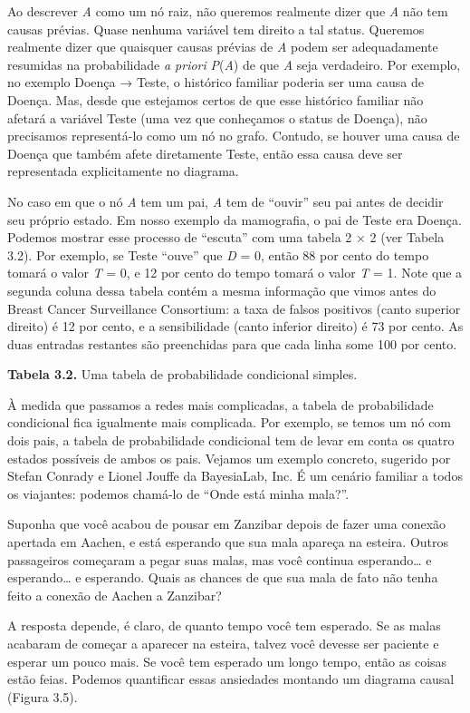 \documentclass[11pt,a5paper,twoside]{book}
\begin{document}
Ao descrever \textit{A} como um nó raiz, não queremos realmente dizer que \textit{A} não tem causas prévias. Quase nenhuma variável tem direito a tal status. Queremos realmente dizer que quaisquer causas prévias de \textit{A} podem ser adequadamente resumidas na probabilidade \textit{a priori} \textit{P}(\textit{A}) de que \textit{A} seja verdadeiro. Por exemplo, no exemplo Doença → Teste, o histórico familiar poderia ser uma causa de Doença. Mas, desde que estejamos certos de que esse histórico familiar não afetará a variável Teste (uma vez que conheçamos o status de Doença), não precisamos representá-lo como um nó no grafo. Contudo, se houver uma causa de Doença que também afete diretamente Teste, então essa causa deve ser representada explicitamente no diagrama.

No caso em que o nó \textit{A} tem um pai, \textit{A} tem de “ouvir” seu pai antes de decidir seu próprio estado. Em nosso exemplo da mamografia, o pai de Teste era Doença. Podemos mostrar esse processo de “escuta” com uma tabela 2 × 2 (ver Tabela 3.2). Por exemplo, se Teste “ouve” que \textit{D} = 0, então 88 por cento do tempo tomará o valor \textit{T} = 0, e 12 por cento do tempo tomará o valor \textit{T} = 1. Note que a segunda coluna dessa tabela contém a mesma informação que vimos antes do Breast Cancer Surveillance Consortium: a taxa de falsos positivos (canto superior direito) é 12 por cento, e a sensibilidade (canto inferior direito) é 73 por cento. As duas entradas restantes são preenchidas para que cada linha some 100 por cento.

\textbf{Tabela 3.2.} Uma tabela de probabilidade condicional simples.

À medida que passamos a redes mais complicadas, a tabela de probabilidade condicional fica igualmente mais complicada. Por exemplo, se temos um nó com dois pais, a tabela de probabilidade condicional tem de levar em conta os quatro estados possíveis de ambos os pais. Vejamos um exemplo concreto, sugerido por Stefan Conrady e Lionel Jouffe da BayesiaLab, Inc. É um cenário familiar a todos os viajantes: podemos chamá-lo de “Onde está minha mala?”.

Suponha que você acabou de pousar em Zanzibar depois de fazer uma conexão apertada em Aachen, e está esperando que sua mala apareça na esteira. Outros passageiros começaram a pegar suas malas, mas você continua esperando… e esperando… e esperando. Quais as chances de que sua mala de fato não tenha feito a conexão de Aachen a Zanzibar?

A resposta depende, é claro, de quanto tempo você tem esperado. Se as malas acabaram de começar a aparecer na esteira, talvez você devesse ser paciente e esperar um pouco mais. Se você tem esperado um longo tempo, então as coisas estão feias. Podemos quantificar essas ansiedades montando um diagrama causal (Figura 3.5).
\end{document}
